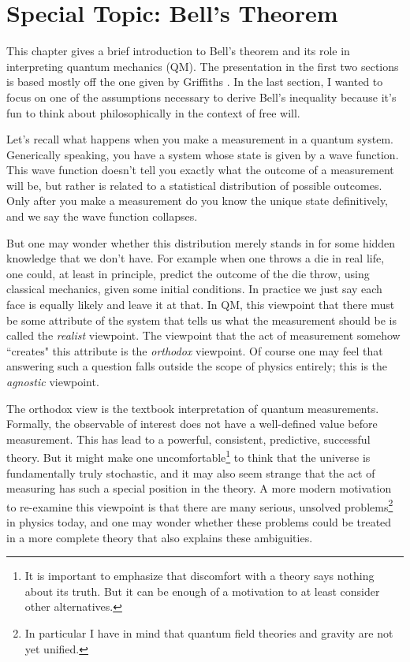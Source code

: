 \chapter{Special Topic: Bell's Theorem}\label{ap:bell}

This chapter gives a brief introduction to Bell's theorem and its role in
interpreting quantum mechanics (QM). The presentation in the first two sections
is based mostly off the one given by Griffiths 
\cite{griffiths_introduction_2005}. In the last section, I wanted to focus
on one of the assumptions necessary to derive Bell's inequality because
it's fun to think about philosophically in the context of free will.

Let's recall what happens when you make a measurement in a quantum system.
Generically speaking, you have a system whose state is given by a wave
function. This wave function doesn't tell you exactly what the
outcome of a measurement will be, but rather is related to a statistical
distribution of possible outcomes. Only after you make a measurement do
you know the unique state definitively, and we say the wave function collapses.

But one may wonder whether this distribution merely stands in for some
hidden knowledge that we don't have. For example when one throws a die
in real life, one could, at least in principle, predict the outcome of
the die throw, using classical mechanics, given some initial conditions.
In practice we just say each face is equally likely and leave it at that.
In QM, this viewpoint that there must be some attribute
of the system that tells us what the measurement should be is called
the {\it realist} viewpoint. The viewpoint that the act of measurement
somehow ``creates" this attribute is the {\it orthodox} viewpoint.
Of course one may feel that answering such a question falls outside the
scope of physics entirely; this is the {\it agnostic} viewpoint.

The orthodox view is the textbook interpretation of quantum
measurements. Formally, the observable of interest does not have a
well-defined value before measurement. This has lead to a powerful,
consistent, predictive, successful theory. But it might make one 
uncomfortable\footnote{It is important to emphasize that discomfort
with a theory says nothing about its truth. But it can be enough of
a motivation to at least consider other alternatives.} to
think that the universe is fundamentally truly stochastic, and it
may also seem strange that the act of measuring has such a special
position in the theory. A more modern motivation to re-examine this
viewpoint is that there are many serious, unsolved problems\footnote{In
particular I have in mind that quantum field theories and gravity are
not yet unified.} in physics today,
and one may wonder whether these problems could be treated in a
more complete theory that also explains these ambiguities.

